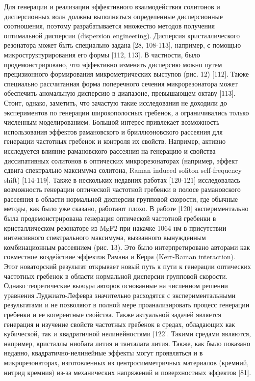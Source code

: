 Для генерации и реализации эффективного взаимодействия солитонов и дисперсионных волн должны выполняться определенные дисперсионные соотношения, поэтому разрабатывается множество методов получения оптимальной дисперсии (dispersion engineering). Дисперсия кристаллического резонатора может быть специально задана [28, 108-113], например, с помощью микроструктурирования его формы [112, 113]. В частности, было продемонстрировано, что эффективно изменять дисперсию можно путем прецизионного формирования микрометрических выступов (рис. 12) [112]. Также специально рассчитанная форма поперечного сечения микрорезонатора может обеспечить аномальную дисперсию в диапазоне, превышающем октаву [113]. Стоит, однако, заметить, что зачастую такие исследования не доходили до экспериментов по генерации широкополосных гребенок, а ограничивались только численным моделированием.
Большой интерес привлекает возможность использования эффектов рамановского и бриллюэновского рассеяния для генерации частотных гребенок и контроля их свойств. Например, активно исследуется влияние рамановского рассеяния на генерацию и свойства диссипативных солитонов в оптических микрорезонаторах (например, эффект сдвига спектрально максимума солитона, Raman induced soliton self-frequency shift) [114-119]. Также в нескольких недавних работах [120-121] исследовалась возможность генерации оптической частотной гребенки в полосе рамановского рассеяния в области нормальной дисперсии групповой скорости, где обычные методы, как было уже сказано, работают плохо. В работе [120] экспериментально была продемонстрирована генерация оптической частотной гребенки в кристаллическом резонаторе из MgF2 при накачке 1064 нм в присутствии интенсивного спектрального максимума, вызванного вынужденным комбинационным рассеянием (рис. 13). Это было интерпретировано авторами как совместное воздействие эффектов Рамана и Керра (Kerr-Raman interaction). Этот новаторский результат открывает новый путь к пути к генерации оптических частотных гребенок в области нормальной дисперсии групповой скорости. Однако теоретические выводы авторов основанные на численном решении уравнения Луджиато-Лефевра значительно расходятся с экспериментальными результатами и не позволяют в полной мере проанализировать процесс генерации гребенки и ее когерентные свойства.
Также актуальной задачей является генерация и изучение свойств частотных гребенок в средах, обладающих как кубической, так и квадратичной нелинейностями [122]. Такими средами являются, например, кристаллы ниобата лития и танталата лития. Также, как было показано недавно, квадратично-нелинейные эффекты могут проявляться и в микрорезонаторах, изготовленных из центросимметричных материалов (кремний, нитрид кремния) из-за механических напряжений и поверхностных эффектов [81].
